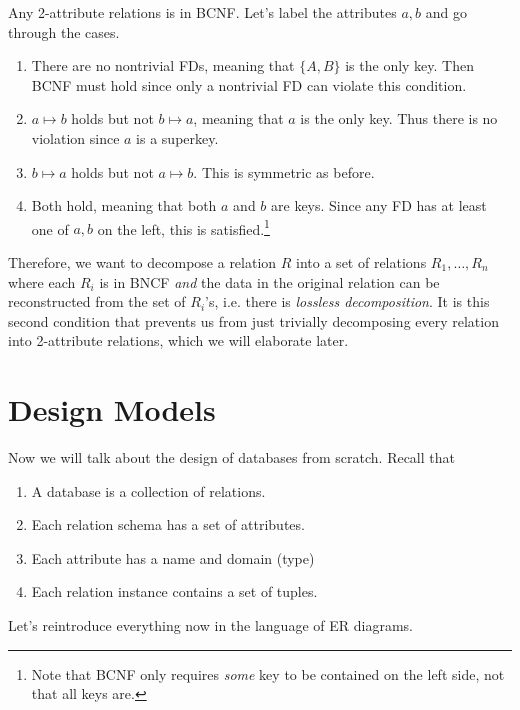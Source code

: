\documentclass{article}
\begin{document}
    \begin{theorem}
      Any 2-attribute relations is in BCNF. Let's label the attributes $a, b$ and go through the cases. 
      \begin{enumerate}
        \item There are no nontrivial FDs, meaning that $\{A, B\}$ is the only key. Then BCNF must hold since only a nontrivial FD can violate this condition. 
        \item $a \mapsto b$ holds but not $b \mapsto a$, meaning that $a$ is the only key. Thus there is no violation since $a$ is a superkey. 
        \item $b \mapsto a$ holds but not $a \mapsto b$. This is symmetric as before. 
        \item Both hold, meaning that both $a$ and $b$ are keys. Since any FD has at least one of $a, b$ on the left, this is satisfied.\footnote{Note that BCNF only requires \textit{some} key to be contained on the left side, not that all keys are. } 
      \end{enumerate}
    \end{theorem}

    Therefore, we want to decompose a relation $R$ into a set of relations $R_1, \ldots, R_n$ where each $R_i$ is in BNCF \textit{and} the data in the original relation can be reconstructed from the set of $R_i$'s, i.e. there is \textit{lossless decomposition}. It is this second condition that prevents us from just trivially decomposing every relation into 2-attribute relations, which we will elaborate later. 

\section{Design Models}

    Now we will talk about the design of databases from scratch. Recall that 
    \begin{enumerate}
      \item A database is a collection of relations. 
      \item Each relation schema has a set of attributes. 
      \item Each attribute has a name and domain (type) 
      \item Each relation instance contains a set of tuples. 
    \end{enumerate}

    Let's reintroduce everything now in the language of ER diagrams. 
\end{document}
